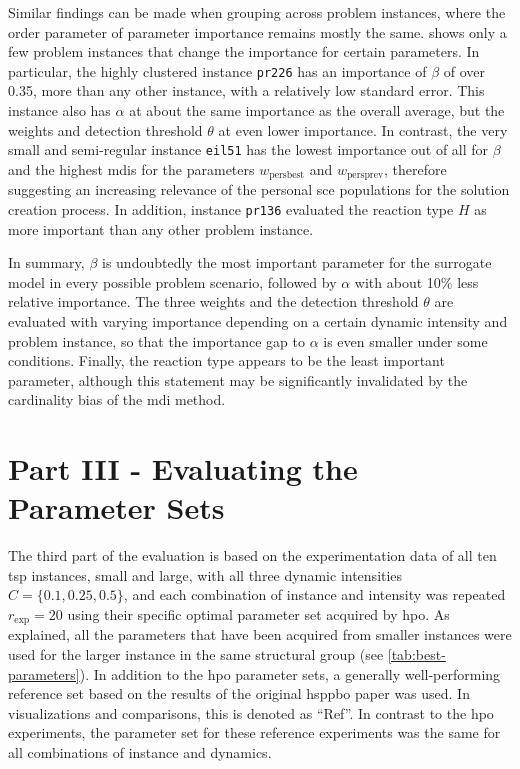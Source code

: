 Similar findings can be made when grouping across problem instances, where the order parameter of parameter importance remains mostly the same.  shows only a few problem instances that change the importance for certain parameters. In particular, the highly clustered instance \texttt{pr226} has an importance of $\beta$ of over 0.35, more than any other instance, with a relatively low standard error. This instance also has $\alpha$ at about the same importance as the overall average, but the weights and detection threshold $\theta$ at even lower importance. In contrast, the very small and semi-regular instance \texttt{eil51} has the lowest importance out of all for $\beta$ and the highest \glspl{mdi} for the parameters $w_{\text{persbest}}$ and $w_{\text{persprev}}$, therefore suggesting an increasing relevance of the personal \gls{sce} populations for the solution creation process. In addition, instance \texttt{pr136} evaluated the reaction type $H$ as more important than any other problem instance. 

In summary, $\beta$ is undoubtedly the most important parameter for the surrogate model in every possible problem scenario, followed by $\alpha$ with about 10\% less relative importance. The three weights and the detection threshold $\theta$ are evaluated with varying importance depending on a certain dynamic intensity and problem instance, so that the importance gap to $\alpha$ is even smaller under some conditions. Finally, the reaction type appears to be the least important parameter, although this statement may be significantly invalidated by the cardinality bias of the \gls{mdi} method. 


\section{Part III - Evaluating the Parameter Sets}

The third part of the evaluation is based on the experimentation data of all ten \gls{tsp} instances, small and large, with all three dynamic intensities $C=\{0.1,0.25,0.5\}$, and each combination of instance and intensity was repeated $r_\text{exp} = 20$ using their specific optimal parameter set acquired by \gls{hpo}. As explained, all the parameters that have been acquired from smaller instances were used for the larger instance in the same structural group (see \cref{tab:best-parameters}). In addition to the \gls{hpo} parameter sets, a generally well-performing reference set based on the results of the original \gls{hsppbo} paper \cite{kupfer2021hierarchical} was used. In visualizations and comparisons, this is denoted as \enquote{Ref}. In contrast to the \gls{hpo} experiments, the parameter set for these reference experiments was the same for all combinations of instance and dynamics.

